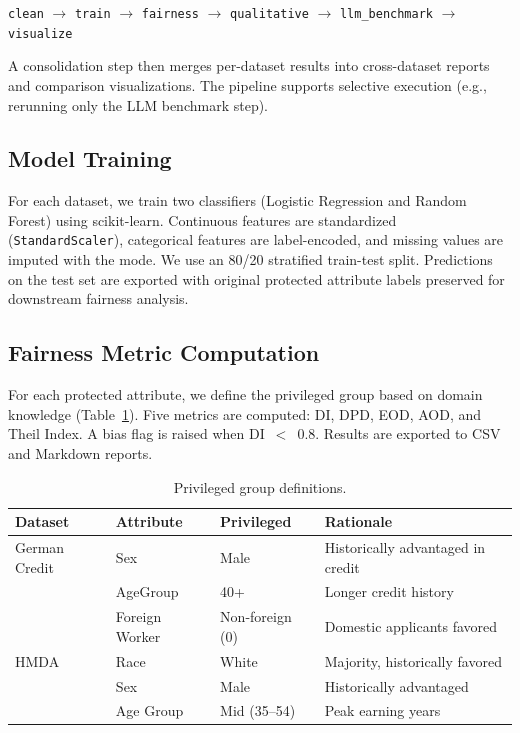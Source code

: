 \documentclass[11pt,a4paper]{article}
\begin{document}
\begin{center}
\texttt{clean} $\rightarrow$ \texttt{train} $\rightarrow$
\texttt{fairness} $\rightarrow$ \texttt{qualitative} $\rightarrow$
\texttt{llm\_benchmark} $\rightarrow$ \texttt{visualize}
\end{center}

A consolidation step then merges per-dataset results into cross-dataset
reports and comparison visualizations. The pipeline supports selective
execution (e.g., rerunning only the LLM benchmark step).

\subsection{Model Training}

For each dataset, we train two classifiers (Logistic Regression and
Random Forest) using scikit-learn. Continuous features are standardized
(\texttt{StandardScaler}), categorical features are label-encoded, and
missing values are imputed with the mode. We use an 80/20 stratified
train-test split. Predictions on the test set are exported with original
protected attribute labels preserved for downstream fairness analysis.

\subsection{Fairness Metric Computation}

For each protected attribute, we define the privileged group based on
domain knowledge (Table~\ref{tab:priv}). Five metrics are computed:
DI, DPD, EOD, AOD, and Theil Index. A bias flag is raised when
DI~$<$~0.8. Results are exported to CSV and Markdown reports.

\begin{table}[H]
\centering
\caption{Privileged group definitions.}
\label{tab:priv}
\begin{tabular}{llll}
\toprule
\textbf{Dataset} & \textbf{Attribute} & \textbf{Privileged} & \textbf{Rationale} \\
\midrule
German Credit & Sex              & Male     & Historically advantaged in credit \\
              & AgeGroup         & 40+      & Longer credit history \\
              & Foreign Worker   & Non-foreign (0) & Domestic applicants favored \\
\midrule
HMDA          & Race             & White    & Majority, historically favored \\
              & Sex              & Male     & Historically advantaged \\
              & Age Group        & Mid (35--54) & Peak earning years \\
\bottomrule
\end{tabular}
\end{table}
\end{document}
